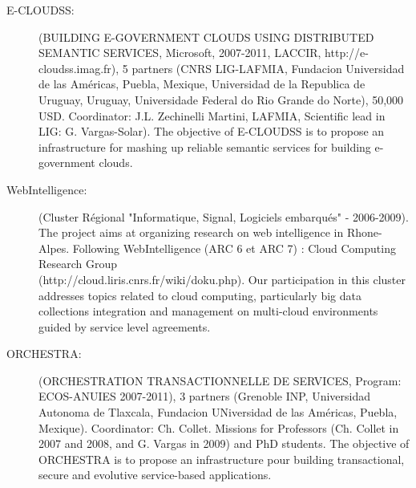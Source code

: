 \begin{description}

\item[E-CLOUDSS:] (BUILDING E-GOVERNMENT CLOUDS USING DISTRIBUTED SEMANTIC SERVICES, Microsoft, 2007-2011, LACCIR, http://e-cloudss.imag.fr), 5 partners (CNRS LIG-LAFMIA, Fundacion Universidad de las Am{\'e}ricas, Puebla, Mexique, Universidad de la Republica de Uruguay, Uruguay, Universidade Federal do Rio Grande do Norte), 50,000 USD. Coordinator: J.L. Zechinelli Martini, LAFMIA, Scientific lead in LIG: G. Vargas-Solar). The objective of E-CLOUDSS is to propose an infrastructure for mashing up reliable semantic services for building e-government clouds. 

\item[WebIntelligence:] (Cluster R{\'e}gional "Informatique, Signal, Logiciels embarqu{\'e}s" - 2006-2009). The project aims at organizing research on web intelligence in Rhone-Alpes.  Following  WebIntelligence (ARC 6 et ARC 7) : Cloud Computing Research Group \\
(http://cloud.liris.cnrs.fr/wiki/doku.php). Our participation in this  cluster addresses topics related to cloud computing, particularly big data collections integration and management on
multi-cloud environments guided by service level agreements. 

\item[ORCHESTRA:] (ORCHESTRATION TRANSACTIONNELLE DE SERVICES, Program: ECOS-ANUIES 2007-2011), 3 partners (Grenoble INP, Universidad Autonoma de Tlaxcala, Fundacion UNiversidad de las Am{\'e}ricas, Puebla, Mexique). Coordinator: Ch. Collet. 
Missions for Professors (Ch. Collet in 2007 and  2008, and G. Vargas in 2009) and PhD students. The objective of ORCHESTRA is to propose an infrastructure pour building transactional, secure and evolutive service-based applications. 


\end{description}
